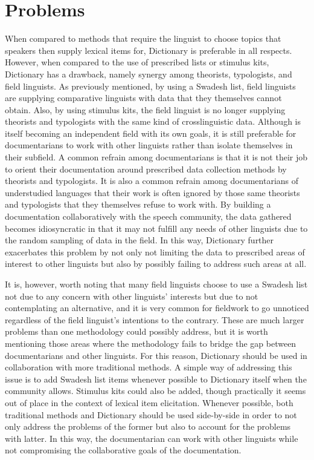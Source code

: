 \documentclass[output=paper,
modfonts
]{langscibook}
\begin{document}
\section{Problems}
\largerpage
When compared to methods that require the linguist to choose topics that speakers then supply lexical items for, Dictionary  is preferable in all respects. However, when compared to the use of prescribed lists or stimulus kits, Dictionary  has a  drawback, namely synergy among theorists, typologists, and field linguists. As previously mentioned, by using a Swadesh list, field linguists are supplying comparative linguists with data that they themselves cannot obtain. Also, by using stimulus kits, the field linguist is no longer supplying theorists and typologists with the same kind of crosslinguistic data. Although  is itself becoming an independent field with its own goals, it is still preferable for documentarians to work with other linguists rather than isolate themselves in their subfield. A common refrain among documentarians is that it is not their job to orient their documentation around prescribed data collection methods by theorists and typologists. It is also a common refrain among documentarians of understudied languages that their work is often ignored by those same theorists and typologists that they themselves refuse to work with. By building a documentation collaboratively with the speech community, the data gathered becomes idiosyncratic in that it may not fulfill any needs of other linguists due to the random sampling of data in the field. In this way, Dictionary  further exacerbates this problem by not only not limiting the data to prescribed areas of interest to other linguists but also by possibly failing to address such areas at all. 

It is, however, worth noting that many field linguists choose to use a Swadesh list not due to any concern with other linguists’ interests but due to not contemplating an alternative, and it is very common for fieldwork to go unnoticed regardless of the field linguist’s intentions to the contrary. These are much larger problems than one methodology could possibly address, but it is worth mentioning those areas where the methodology fails to bridge the gap between documentarians and other linguists. For this reason, Dictionary  should be used in collaboration with more traditional methods. A simple way of addressing this issue is to add Swadesh list items whenever possible to Dictionary  itself when the community allows. Stimulus kits could also be added, though practically it seems out of place in the context of lexical item elicitation. Whenever possible, both traditional methods and Dictionary  should be used side-by-side in order to not only address the problems of the former but also to account for the problems with latter. In this way, the documentarian can work with other linguists while not compromising the collaborative goals of the documentation. 
\end{document}
